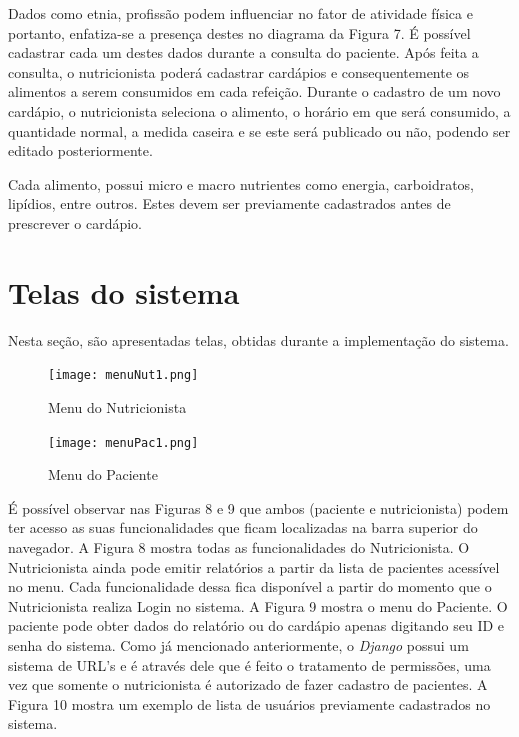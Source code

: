 Dados como etnia, profissão podem influenciar no fator de atividade física e portanto,
enfatiza-se a presença destes no diagrama da Figura 7. É possível cadastrar cada um destes
dados durante a consulta do paciente. Após feita a consulta, o nutricionista poderá
cadastrar cardápios e consequentemente os alimentos a serem consumidos em cada refeição.
Durante o cadastro de um novo cardápio, o nutricionista seleciona o alimento,
o horário em que será consumido, a quantidade normal, a medida caseira e se este
será publicado ou não, podendo ser editado posteriormente.

Cada alimento, possui micro e macro nutrientes como energia, carboidratos,
lipídios, entre outros. Estes devem ser previamente cadastrados antes de prescrever o
cardápio.

\section{Telas do sistema}

Nesta seção, são apresentadas telas, obtidas durante a implementação do sistema.

\begin{figure} [hbt] 
\begin{center}
\texttt{[image: menuNut1.png]}
\end{center}
\label{menuNut} 
\caption{Menu do Nutricionista}
\end{figure}

\begin{figure} [hbt] 
\begin{center}
\texttt{[image: menuPac1.png]}
\end{center}
\label{menuPac} 
\caption{Menu do Paciente}
\end{figure}

É possível observar nas Figuras 8 e 9 que ambos (paciente e nutricionista) podem ter acesso as suas funcionalidades que ficam localizadas na barra superior do navegador.
A Figura 8 mostra todas as funcionalidades do Nutricionista. O Nutricionista
ainda pode emitir relatórios a partir da lista de pacientes acessível no menu. Cada
funcionalidade dessa fica disponível a partir do momento que o Nutricionista realiza 
Login no sistema. A Figura 9 mostra o menu do Paciente. O paciente pode obter dados
do relatório ou do cardápio apenas digitando seu ID e senha do sistema.
Como já mencionado anteriormente, o \textit{Django} possui um sistema de URL's e é através dele que
é feito o tratamento de permissões, uma vez que somente o nutricionista é autorizado de fazer cadastro
de pacientes. A Figura 10 mostra um exemplo de lista de usuários previamente cadastrados no sistema.

